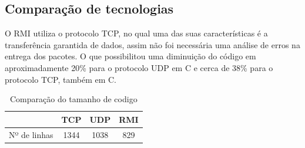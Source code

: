 \documentclass[10pt,a4paper]{article}
\begin{document}
\begin{center}
  \begin{table}[h!]
    \begin{centering}
      \par\end{centering}
    \caption{Ver compromissos do mês}
  \end{table}
  \par\end{center}
\newpage

\subsection{Comparação de tecnologias}
O RMI utiliza o protocolo TCP, no qual uma das suas características é 
a transferência garantida de dados, assim não foi necessária uma análise de erros na entrega
dos pacotes. O que possibilitou uma diminuição do código em aproximadamente 20\% para o protocolo UDP em C e cerca de 38\% para o protocolo TCP, também em C.

\begin{table}[h!]
  \begin{center}
  
    \begin{tabular}{cccc}
      
       & TCP&  UDP & RMI\\
      \hline
      Nº de linhas & 1344 & 1038 & 829 \\
    \end{tabular}
  \end{center}
      \vspace{-5mm}
    \caption{Comparação do tamanho de codigo} \label{compcom}
\end{table}
\end{document}
